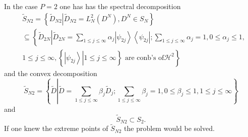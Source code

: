 \documentclass[aps,preprint]{revtex4}%
\begin{document}
In the case $P=2$ one has has the spectral decomposition
\begin{align}
&  \tilde{S}_{N2}=\left\{  \left.  \tilde{D}_{N2}\right\vert \tilde{D}%
_{N2}=L_{N}^{2}\left(  D^{N}\right)  ,D^{N}\in S_{N}\right\} \nonumber\\
&  \subseteq\left\{  \tilde{D}_{2N}\left\vert \tilde{D}_{2N}=\sum_{1\leq
j\leq\infty}\alpha_{j}\left\vert \psi_{2j}\right\rangle \left\langle \psi
_{2j}\right\vert ;\sum_{1\leq j\leq\infty}\alpha_{j}=1,0\leq\alpha_{j}%
\leq1,\right.  \right. \nonumber\\
&  \left.  1\leq j\leq\infty,\left\{  \left.  \left\vert \psi_{2j}%
\right\rangle \right\vert 1\leq j\leq\infty\right\}  \text{ are conb's of
}\mathcal{H}^{2}\right\}
\end{align}
and the convex decomposition%
\begin{equation}
\tilde{S}_{N2}=\left\{  \tilde{D}\left\vert \tilde{D}=\sum_{1\leq j\leq\infty
}\beta_{j}\tilde{D}_{j};\sum_{1\leq j\leq\infty}\beta_{j}=1,0\leq\beta_{j}%
\leq1,1\leq j\leq\infty\right.  \right\}
\end{equation}
and
\begin{equation}
\tilde{S}_{N2}\subset S_{2}.
\end{equation}
If one knew the extreme points of $\tilde{S}_{N2}$ the problem would be solved.
\end{document}
